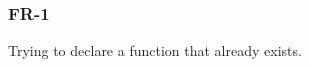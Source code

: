 \subsubsection{FR-1}\label{sec:error_code_fr_1}

Trying to declare a function that already exists.


